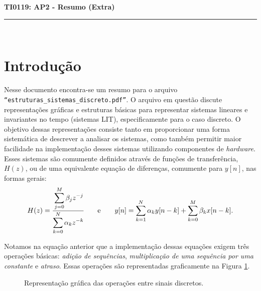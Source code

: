 \documentclass[11pt]{article}
\begin{document}
\setcounter{secnumdepth}{1}
\setcounter{tocdepth}{1}

 \hfill {\Large \bfseries TI0119: AP2 - Resumo (Extra)} 

\noindent\rule{4cm}{0.4pt} \vskip0.5cm

{ \\}

\section{Introdução}

Nesse documento encontra-se um resumo para o arquivo \texttt{``estruturas\_sistemas\_discreto.pdf''}. O arquivo em questão discute representações gráficas e estruturas básicas para representar sistemas lineares e invariantes no tempo (sistemas LIT), especificamente para o caso discreto. O objetivo dessas representações consiste tanto em proporcionar uma forma sistemática de descrever a analisar os sistemas, como também permitir maior facilidade na implementação desses sistemas utilizando componentes de \textit{hardware}. Esses sistemas são comumente definidos através de funções de transferência, $H(z)$, ou de uma equivalente equação de diferenças, comumente para $y[n]$, nas formas gerais:
\begin{equation} \label{eq:sistemas}
\begin{matrix}
	H(z) = \cfrac{\displaystyle\sum_{j = 0}^{M} \beta_j z^{-j}}{\displaystyle\sum_{k = 0}^{N} \alpha_k z^{-k}}
	& & \text{e} & &
	y[n] = \displaystyle\sum_{k=1}^{N} \alpha_k y[n-k] + \displaystyle\sum_{k=0}^{M} \beta_k x[n-k].
\end{matrix}
\end{equation} 

\noindent Notamos na equação anterior que a implementação dessas equações exigem três operações básicas: \textit{adição de sequências}, \textit{multiplicação de uma sequência por uma constante} e \textit{atraso}. Essas operações são representadas graficamente na Figura \ref{fig:operations}.

\begin{figure}[ht] \centering
	\begin{subfigure}[b]{0.3\textwidth}
		\resizebox{\textwidth}{!}{}
		\caption{}
	\end{subfigure}%
	\hfill
	\begin{subfigure}[b]{0.3\textwidth}
		\resizebox{\textwidth}{!}{}
		\caption{}
	\end{subfigure}%
	\hfill
	\begin{subfigure}[b]{0.3\textwidth}
		\resizebox{\textwidth}{!}{}
		\vskip0.15cm
		\caption{}
	\end{subfigure}

	\caption{Representação gráfica das operações entre sinais discretos.}
	\label{fig:operations}
\end{figure}
\end{document}
